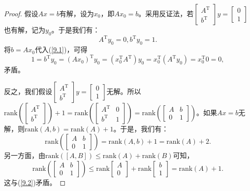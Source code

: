 \documentclass[UTF8]{ctexart}
\begin{document}
\begin{proof}
	假设$Ax =b$有解，设为$x_0$，即$Ax_0 = b$。采用反证法，若$\begin{bmatrix}
		A^{\mathrm{T}} \\
		b^{\mathrm{T}} 
	\end{bmatrix} y= \begin{bmatrix}
		0 \\
		1 
	\end{bmatrix}$也有解，记为$y_0$。于是我们有：
	\begin{equation}\label{9.1}
		A^{\mathrm{T}} y_0 = 0 , b^{\mathrm{T}} y_0 = 1.
	\end{equation}
	将$b  =Ax_0$代入(\ref{9.1})，可得
	\[
	1 = b^{\mathrm{T}} y_0 = (Ax_0)^{\mathrm{T}} y_0 = (x_0^{\mathrm{T}}  A^{\mathrm{T}}) y_0 = x_0^{\mathrm{T}}  (A^{\mathrm{T}} y_0) = x_0^{\mathrm{T}} 0  = 0,
	\]
	矛盾。
	\
	
	反之，我们假设$\begin{bmatrix}
		A^{\mathrm{T}} \\
		b^{\mathrm{T}} 
	\end{bmatrix} y= \begin{bmatrix}
		0 \\
		1 
	\end{bmatrix}$无解。所以$\mathrm{rank}(\begin{bmatrix}
		A^{\mathrm{T}} \\
		b^{\mathrm{T}} 
	\end{bmatrix}) +1 = \mathrm{rank}(\begin{bmatrix}
		A^{\mathrm{T}} & 0\\
		b^{\mathrm{T}}  & 1
	\end{bmatrix}) = \mathrm{rank}(\begin{bmatrix}
		A & b\\
		0  & 1
	\end{bmatrix})$。如果$Ax =b$无解，则$\mathrm{rank}(A, b) = \mathrm{rank}(A) + 1$。于是，我们有：
	\begin{equation} \label{9.2}
		\mathrm{rank}(\begin{bmatrix}
			A & b\\
			0  & 1
		\end{bmatrix}) = \mathrm{rank}(A, b) + 1 = \mathrm{rank}(A) + 2.
	\end{equation}
	另一方面，由$\mathrm{rank}([A, B]) \leq \mathrm{rank}(A)+\mathrm{rank}(B)$可知，\[\mathrm{rank}(\begin{bmatrix}
		A & b\\
		0  & 1
	\end{bmatrix}) \leq \mathrm{rank}\begin{bmatrix}
		A \\
		0 
	\end{bmatrix} + \mathrm{rank}\begin{bmatrix}
		b \\
		1 
	\end{bmatrix} = \mathrm{rank}(A) + 1.\]
	这与(\ref{9.2})矛盾。
\end{proof}
\end{document}
